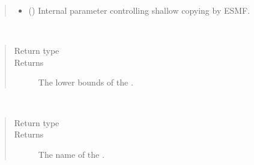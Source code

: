 \documentclass[letterpaper,10pt,english]{sphinxmanual}
\begin{document}
\begin{fulllineitems}
\begin{quote}
\begin{description}
\begin{itemize}
\item {} 
 () \textendash{} Internal parameter controlling shallow copying by ESMF.

\end{itemize}

\end{description}\end{quote}

\begin{fulllineitems}
\label{\detokenize{locstream:ESMF.api.locstream.LocStream.lower_bounds}}~\begin{quote}\begin{description}
\item[{Return type}] \leavevmode
{}

\item[{Returns}] \leavevmode
The lower bounds of the {\hyperref[\detokenize{locstream:ESMF.api.locstream.LocStream}]{}}.

\end{description}\end{quote}

\end{fulllineitems}


\begin{fulllineitems}
\label{\detokenize{locstream:ESMF.api.locstream.LocStream.name}}~\begin{quote}\begin{description}
\item[{Return type}] \leavevmode
{}

\item[{Returns}] \leavevmode
The name of the {\hyperref[\detokenize{locstream:ESMF.api.locstream.LocStream}]{}}.


\end{description}
\end{quote}
\end{fulllineitems}
\end{fulllineitems}
\end{document}
